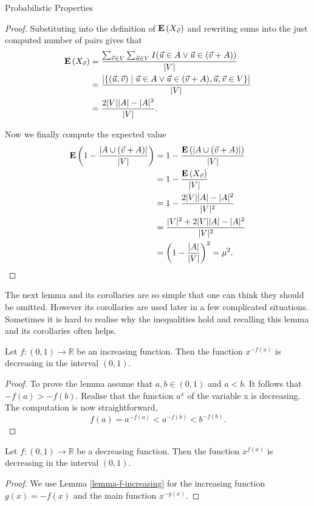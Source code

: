 \begin{section}{Probabilistic Properties}
\begin{lemma}
\begin{proof}
Substituting into the definition of $\mathbf{E}\left(X_{\vec{v}}\right)$ and rewriting sums into the just computed number of pairs gives that
\[
\begin{split}
\mathbf{E}\left(X_{\vec{v}}\right) 
	& = \frac{\sum_{\vec{v} \in V} \sum_{\vec{u} \in V} I(\vec{u} \in A \vee \vec{u} \in (\vec{v} + A))}{|V|}  \\
	& = \frac{|\{(\vec{u}, \vec{v}) \mid \vec{u} \in A \vee \vec{u} \in (\vec{v} + A), \vec{u}, \vec{v} \in V \}|}{|V|} \\ 
	& = \frac{2|V||A| - |A|^2}{|V|} \text{.}
\end{split}
\]

Now we finally compute the expected value
\[
\begin{split}
\mathbf{E}\left(1 - \frac{|A \cup (\vec{v} + A)|}{|V|}\right) 
	& = 1 - \frac{\mathbf{E}\left(|A \cup (\vec{v} + A)|\right)}{|V|}  \\
	& = 1 - \frac{\mathbf{E}\left(X_{\vec{v}}\right)}{|V|} \\
	& = 1 - \frac{2|V||A| - |A|^2}{|V|^2} \\
	& = \frac{|V|^2 + 2|V||A| - |A|^2}{|V|^2} \\
	& = \left(1 - \frac{|A|}{|V|}\right)^2 = \mu^2 \text{.}
\end{split}
\]
\end{proof}
\end{lemma}

The next lemma and its corollaries are so simple that one can think they should be omitted. However its corollaries are used later in a few complicated situations. Sometimes it is hard to realise why the inequalities hold and recalling this lemma and its corollaries often helps.
\begin{lemma}
\label{lemma-f-increasing}
Let $f: (0, 1) \rightarrow \mathbb{R}$ be an increasing function. Then the function $x ^ {-f(x)}$ is decreasing in the interval $(0, 1)$.
\end{lemma}
\begin{proof}
To prove the lemma assume that $a, b \in (0, 1)$ and $a < b$. It follows that $-f(a) > -f(b)$. Realise that the function $a ^ x$ of the variable x is decreasing. The computation is now straightforward,
\[
f(a) = a ^ {-f(a)} < a ^ {-f(b)} < b ^ {-f(b)} \text{.}
\]
\end{proof}

\begin{corollary}
\label{corollary-f-decreasing}
Let $f: (0, 1) \rightarrow \mathbb{R}$ be a decreasing function. Then the function $x ^ {f(x)}$ is decreasing in the interval $(0, 1)$.
\end{corollary}
\begin{proof}
We use Lemma \ref{lemma-f-increasing} for the increasing function $g(x) = -f(x)$ and the main function $x^{-g(x)}$.
\end{proof}


\end{section}
